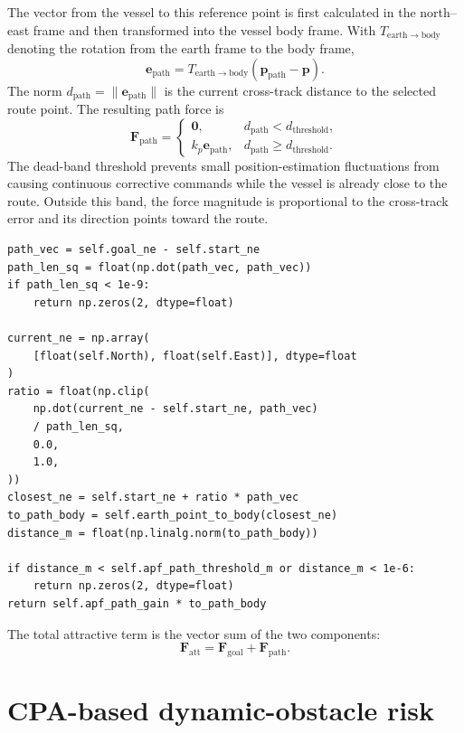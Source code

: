 \documentclass[11pt,a4paper]{article}
\begin{document}
The vector from the vessel to this reference point is first calculated in the
north--east frame and then transformed into the vessel body frame. With
$T_{\mathrm{earth}\rightarrow\mathrm{body}}$ denoting the rotation from the
earth frame to the body frame,
\begin{equation}
\bm{e}_{\mathrm{path}}=
T_{\mathrm{earth}\rightarrow\mathrm{body}}
(\bm{p}_{\mathrm{path}}-\bm{p}).
\end{equation}
The norm $d_{\mathrm{path}}=\lVert\bm{e}_{\mathrm{path}}\rVert$ is the current
cross-track distance to the selected route point. The resulting path force is
\begin{equation}
\bm{F}_{\mathrm{path}}=
\begin{cases}
\bm{0}, & d_{\mathrm{path}}<d_{\mathrm{threshold}},\\
k_p\bm{e}_{\mathrm{path}}, & d_{\mathrm{path}}\geq d_{\mathrm{threshold}}.
\end{cases}
\end{equation}
The dead-band threshold prevents small position-estimation fluctuations from
causing continuous corrective commands while the vessel is already close to
the route. Outside this band, the force magnitude is proportional to the
cross-track error and its direction points toward the route.

\begin{lstlisting}
path_vec = self.goal_ne - self.start_ne
path_len_sq = float(np.dot(path_vec, path_vec))
if path_len_sq < 1e-9:
    return np.zeros(2, dtype=float)

current_ne = np.array(
    [float(self.North), float(self.East)], dtype=float
)
ratio = float(np.clip(
    np.dot(current_ne - self.start_ne, path_vec)
    / path_len_sq,
    0.0,
    1.0,
))
closest_ne = self.start_ne + ratio * path_vec
to_path_body = self.earth_point_to_body(closest_ne)
distance_m = float(np.linalg.norm(to_path_body))

if distance_m < self.apf_path_threshold_m or distance_m < 1e-6:
    return np.zeros(2, dtype=float)
return self.apf_path_gain * to_path_body
\end{lstlisting}

The total attractive term is the vector sum of the two components:
\begin{equation}
\bm{F}_{\mathrm{att}}=
\bm{F}_{\mathrm{goal}}+\bm{F}_{\mathrm{path}}.
\end{equation}

\section{CPA-based dynamic-obstacle risk}
\end{document}
